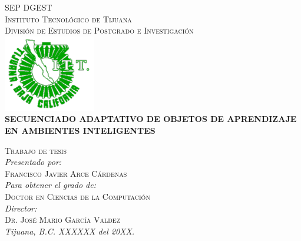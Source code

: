 \documentclass[12pt,letterpaper,oneside] {memoir}
\newcommand{\HRule}{\rule{\linewidth}{0.5mm}}
\begin{document}
	\thispagestyle{empty} 
\enlargethispage*{1000pt}
	\begin{center} 
	{ \textsc{\Large SEP } \hfill  \textsc{\Large DGEST}}\\[0.5cm]
	\textsc{\Large Instituto Tecnológico de Tijuana}\\[0.5cm]
	\textsc{\Large División de Estudios de Postgrado e Investigación }\\[1.0cm]
	\includegraphics[width=0.3\textwidth]{./logo}\\[0.5cm] %
	{ \LARGE \bfseries SECUENCIADO ADAPTATIVO DE OBJETOS DE APRENDIZAJE EN AMBIENTES INTELIGENTES}\\[1.5cm]
	\begin{minipage}{1.0\textwidth}
	\begin{flushright} 
	\textsc{ Trabajo de tesis}\\[0.5cm]
	\emph{Presentado por:} \\
	\textsc{ Francisco Javier Arce Cárdenas}	\\
	\vspace{5 mm}
	\emph{Para obtener el grado de:} \\
	\textsc{Doctor en Ciencias  de la Computación} \\
	\vspace{5 mm}
	\emph{Director:} \\
	\textsc{Dr. José Mario García Valdez} \\
	\vspace{5 mm}
	\emph{Tijuana, B.C. XXXXXX del 20XX.}
	\end{flushright}
	\end{minipage}
	\vspace{13 mm}
	\vfill

	\end{center}
\clearpage
\thispagestyle{empty}
\end{document}

